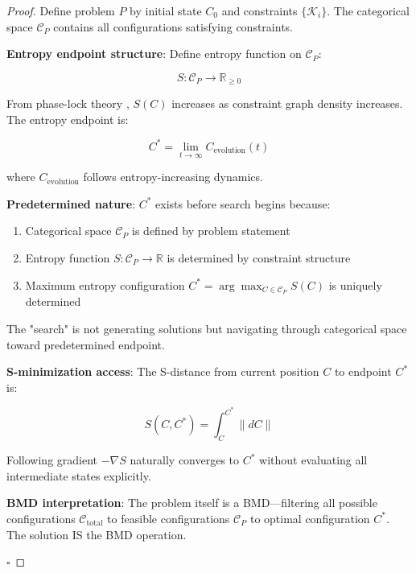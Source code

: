 \documentclass[12pt,a4paper]{article}
\begin{document}
\begin{proof}
Define problem $P$ by initial state $C_0$ and constraints $\{\mathcal{K}_i\}$. The categorical space $\mathcal{C}_P$ contains all configurations satisfying constraints.

\textbf{Entropy endpoint structure}: Define entropy function on $\mathcal{C}_P$:

\begin{equation}
S: \mathcal{C}_P \to \mathbb{R}_{\geq 0}
\end{equation}

From phase-lock theory \cite{sachikonye2024gibbs}, $S(C)$ increases as constraint graph density increases. The entropy endpoint is:

\begin{equation}
C^* = \lim_{t \to \infty} C_{\text{evolution}}(t)
\end{equation}

where $C_{\text{evolution}}$ follows entropy-increasing dynamics.

\textbf{Predetermined nature}: $C^*$ exists before search begins because:
\begin{enumerate}
\item Categorical space $\mathcal{C}_P$ is defined by problem statement
\item Entropy function $S: \mathcal{C}_P \to \mathbb{R}$ is determined by constraint structure
\item Maximum entropy configuration $C^* = \arg\max_{C \in \mathcal{C}_P} S(C)$ is uniquely determined
\end{enumerate}

The "search" is not generating solutions but navigating through categorical space toward predetermined endpoint.

\textbf{S-minimization access}: The S-distance from current position $C$ to endpoint $C^*$ is:

\begin{equation}
S(C, C^*) = \int_C^{C^*} \|dC\|
\end{equation}

Following gradient $-\nabla S$ naturally converges to $C^*$ without evaluating all intermediate states explicitly.

\textbf{BMD interpretation}: The problem itself is a BMD—filtering all possible configurations $\mathcal{C}_{\text{total}}$ to feasible configurations $\mathcal{C}_P$ to optimal configuration $C^*$. The solution IS the BMD operation.

$\square$
\end{proof}
\end{document}
